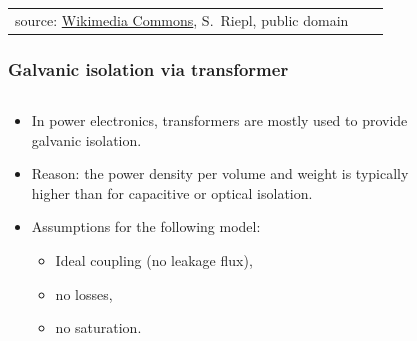 \begin{frame}
\begin{table}
\begin{tabular}{M{0.3\textwidth} M{0.3\textwidth} M{0.3\textwidth}}
{            {\small source: \href{https://commons.wikimedia.org/wiki/File:Trafo-innenleben.jpg}{Wikimedia Commons}, S.~Riepl, public domain}
            }

		\end{tabular}
	\end{table}
\end{frame}

\begin{frame}
    \frametitle{Galvanic isolation via transformer}
    \begin{columns}
        \begin{column}{0.4\textwidth}
            \begin{itemize}
                \item In power electronics, transformers are mostly used to provide galvanic isolation.
                \item<2-> Reason: the power density per volume and weight is typically higher than for capacitive or optical isolation.
                \item<3-> Assumptions for the following model:
                \begin{itemize}
                    \item<3-> Ideal coupling \newline(no leakage flux),
                    \item<4-> no losses,
                    \item<5-> no saturation.
                \end{itemize}
            \end{itemize}
        \end{column}
        \begin{column}{0.6\textwidth}
            \begin{figure}
\end{figure}
\end{column}
\end{columns}
\end{frame}
